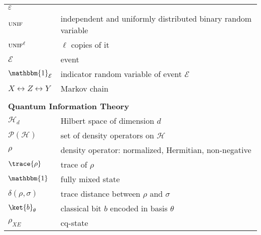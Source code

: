 \documentclass[final,11pt,a4paper]{report}
\renewcommand*{\id}{\mathbbm{1}}   %
\newcommand*{\cH}{\mathcal{H}}
\newcommand*{\unif}{\mbox{\sc unif}}
\renewcommand*{\I}{\mathbbm{1}}
\newcommand*{\dens}[1]{\mathcal{P}(#1)}  %
\newcommand*{\eps}{\varepsilon}
\newcommand*{\ev}{\ensuremath{\mathcal{E}}\xspace} %
\begin{document}
\begin{tabular}{ll}
$\eps$ \\
$\unif$ & independent and uniformly distributed binary random
variable\\
$\unif^\ell$ & $\ell$ copies of it\\
$\ev$ & \index{event $\ev$}event \\
$\id_{\ev}$ & \index{indicator random variable}indicator random variable of event $\ev$\\ 
$X \!\leftrightarrow\! Z \!\leftrightarrow\! Y$ & \index{Markov chain}Markov chain\\ \hline
\\
\multicolumn{2}{l}{\bf Quantum Information Theory} \\ \hline
$\cH_d$ & \index{Hilbert space}Hilbert space of dimension $d$\\
$\dens{\cH}$ & set of \index{density operator}density operators on $\cH$ \\
$\rho$ & density operator: normalized, Hermitian, non-negative\\
$\trace{\rho}$ & \index{trace}trace of $\rho$ \\
$\id$ & \index{$\I$ (fully mixed state)}fully mixed state\\
$\delta(\rho,\sigma)$ & \index{trace distance}trace distance between $\rho$ and $\sigma$ \\
$\ket{b}_{\theta}$ & classical bit $b$ encoded in basis $\theta$\\
$\rho_{XE}$ & \index{cq-state}cq-state \\ \hline
\end{tabular}
\end{document}

